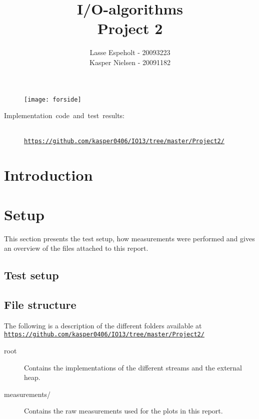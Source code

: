 \documentclass[a4paper,12pt]{article}
\begin{document}
\title{I/O-algorithms\\Project 2}

\author{Lasse Espeholt - 20093223\\
Kasper Nielsen - 20091182\\}

\maketitle
\begin{figure}[h!]
\texttt{[image: forside]}
\end{figure}

\vfill{}
\begin{description}
\item [{Implementation~code~and~test~results:}]~
\\
\texttt{\url{https://github.com/kasper0406/IO13/tree/master/Project2/}}
\end{description}
\pagebreak{}\tableofcontents{}\pagebreak{}

\section{Introduction}


\section{Setup}
This section presents the test setup, how measurements were performed
and gives an overview of the files attached to this report.

\subsection{Test setup}


\subsection{File structure}
The following is a description of the different folders available at
\\
\texttt{\url{https://github.com/kasper0406/IO13/tree/master/Project2/}}
\begin{description}
\item[root] Contains the implementations of the different streams and
  the external heap.

\item[measurements/] Contains the raw measurements used for the plots in this
  report.
\end{description}
\end{document}
